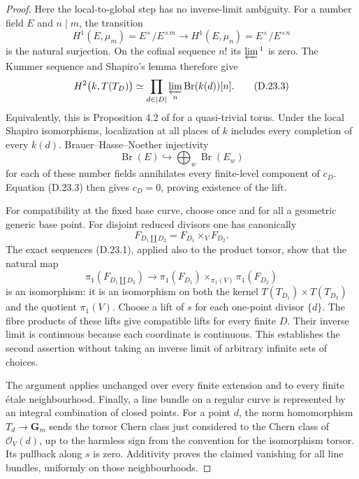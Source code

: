 \begin{proof}
Here the local-to-global step has no inverse-limit ambiguity.  For a
number field $E$ and $n\mid m$, the transition
\[
 H^1(E,\mu_m)=E^\times/E^{\times m}
   \longrightarrow H^1(E,\mu_n)=E^\times/E^{\times n}
\]
is the natural surjection.  On the cofinal sequence $n!$ its
$\varprojlim{}^1$ is zero.  The Kummer sequence and Shapiro's lemma
therefore give
\[
 H^2\bigl(k,T(T_D)\bigr)
 \simeq \prod_{d\in|D|}\varprojlim_n
                   \operatorname{Br}(k(d))[n].
 \tag{D.23.3}
\]
Equivalently, this is Proposition 4.2 of
\cite{D_BorneEmsalemStix2015} for a quasi-trivial torus.
Under the local Shapiro isomorphisms, localization at all places of
$k$ includes every completion of every $k(d)$.  Brauer--Hasse--Noether
injectivity
\[
 \operatorname{Br}(E)\hookrightarrow
          \bigoplus_w\operatorname{Br}(E_w)
\]
for each of these number fields
\cite[Chapter VIII, Theorem 4.2]{D_MilneCFT2020}
annihilates every finite-level component of $c_D$.  Equation
(D.23.3) then gives $c_D=0$, proving existence of the lift.

For compatibility at the fixed base curve, choose once and for all
a geometric generic base point.  For disjoint reduced divisors one
has canonically
\[
 F_{D_1\amalg D_2}=F_{D_1}\times_V F_{D_2}.
\]
The exact sequences (D.23.1), applied also to the product torsor,
show that the natural map
\[
 \pi_1(F_{D_1\amalg D_2})
  \longrightarrow
 \pi_1(F_{D_1})\times_{\pi_1(V)}\pi_1(F_{D_2})
\]
is an isomorphism: it is an isomorphism on both the kernel
$T(T_{D_1})\times T(T_{D_2})$ and the quotient $\pi_1(V)$.
Choose a lift of $s$ for each one-point divisor $\{d\}$.  The fibre
products of these lifts give compatible lifts for every finite $D$.
Their inverse limit is continuous because each coordinate is
continuous.  This establishes the second assertion without taking
an inverse limit of arbitrary infinite sets of choices.

The argument applies unchanged over every finite extension and to
every finite étale neighbourhood.  Finally, a line bundle on a
regular curve is represented by an integral combination of closed
points.  For a point $d$, the norm homomorphism
$T_d\to\mathbf G_m$ sends the torsor Chern class just considered to
the Chern class of $\mathcal O_V(d)$, up to the harmless sign from
the convention for the isomorphism torsor.  Its pullback along $s$
is zero.  Additivity proves the claimed vanishing for all line
bundles, uniformly on those neighbourhoods.
\end{proof}

